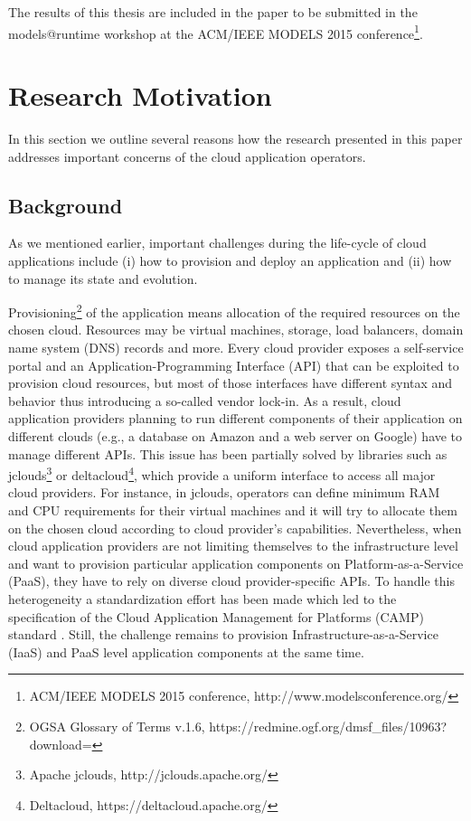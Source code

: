 The results of this thesis are included in the paper to be submitted in the models@runtime workshop at the ACM/IEEE MODELS 2015 conference\footnote{ ACM/IEEE MODELS 2015 conference, http://www.modelsconference.org/}.



\section{Research Motivation}

In this section we outline several reasons how the research presented in this paper  addresses important concerns of the cloud application operators.

\subsection{Background}

\noindent As we mentioned earlier, important challenges during the life-cycle of cloud applications include (i) how to provision and deploy an application and (ii) how to manage its state and evolution. 

\noindent Provisioning\footnote{ OGSA Glossary of Terms v.1.6, $  $https://redmine.ogf.org/dmsf\_files/10963?download=} of the application means allocation of the required resources on the chosen cloud. Resources may be virtual machines, storage, load balancers, domain name system (DNS) records and more. Every cloud provider exposes a self-service portal and an Application-Programming Interface (API) that can be exploited to provision cloud resources, but most of those interfaces have different syntax and behavior thus introducing a so-called vendor lock-in. As a result, cloud application providers planning to run different components of their application on different clouds (e.g., a database on Amazon and a web server on Google) have to manage different APIs. This issue has been partially solved by libraries such as jclouds\footnote{ Apache jclouds, $  $http://jclouds.apache.org/} or deltacloud\footnote{ Deltacloud, https://deltacloud.apache.org/ }, which provide a uniform interface to access all major cloud providers. For instance, in jclouds, operators can define minimum RAM and CPU requirements for their virtual machines and it will try to allocate them on the chosen cloud according to cloud provider's capabilities. Nevertheless, when cloud application providers are not limiting themselves to the infrastructure level and want to provision particular application components on Platform-as-a-Service (PaaS),  they have to rely on diverse cloud provider-specific APIs. To handle this heterogeneity a standardization effort has been made which led to the specification of the Cloud Application Management for Platforms (CAMP) standard \cite{CAMP-v1.1}. Still, the challenge remains to provision Infrastructure-as-a-Service (IaaS) and PaaS level application components at the same time.

